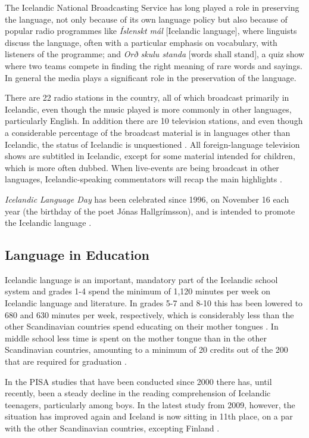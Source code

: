 \begin{multicols}{2}

The Icelandic National Broadcasting Service has long played a role in preserving the language, not only because of its own language policy but also because of popular radio programmes like \textit{Íslenskt mál} {[}Icelandic language{]}, where linguists discuss the language, often with a particular emphasis on vocabulary, with listeners of the programme; and \textit{Orð skulu standa} {[}words shall stand{]}, a quiz show where two teams compete in finding the right meaning of rare words and sayings. In general the media plays a significant role in the preservation of the language.

There are 22 radio stations in the country, all of which broadcast primarily in Icelandic, even though the music played is more commonly in other languages, particularly English. In addition there are 10 television stations, and even though a considerable percentage of the broadcast material is in languages other than Icelandic, the status of Icelandic is unquestioned \cite{hag2}.  All foreign-language television shows are subtitled in Icelandic, except for some material intended for children, which is more often dubbed. When live-events are being broadcast in other languages, Icelandic-speaking commentators will recap the main highlights \cite{alt3}. 

\textit{Icelandic Language Day} has been celebrated since 1996, on November 16 each year (the birthday of the poet Jónas Hallgrímsson), and is intended to promote the Icelandic language \cite{men1}.

\subsection{Language in Education}

Icelandic language is an important, mandatory part of the Icelandic school system and grades 1-4 spend the minimum of 1,120 minutes per week on Icelandic language and literature. In grades 5-7 and 8-10 this has been lowered to 680 and 630 minutes per week, respectively, which is considerably less than the other Scandinavian countries spend educating on their mother tongues \cite{men2}.  In middle school less time is spent on the mother tongue than in the other Scandinavian countries, amounting to a minimum of 20 credits out of the 200 that are required for graduation \cite{men3}.

In the PISA studies that have been conducted since 2000 there has, until recently, been a steady decline in the reading comprehension of Icelandic teenagers, particularly among boys. In the latest study from 2009, however, the situation has improved again and Iceland is now sitting in 11th place, on a par with the other Scandinavian countries, excepting Finland \cite{nam1}. 


\end{multicols}
